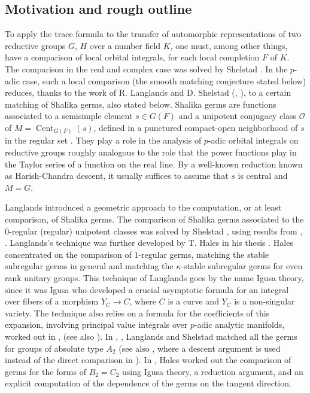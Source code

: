 \documentclass[12pt,letterpaper]{amsart}
\theoremstyle{plain}
\theoremstyle{definition}
\theoremstyle{remark}
\theoremstyle{definition}
\DeclareMathOperator{\Cent}{Cent}
\begin{document}
\subsection*{Motivation and rough outline}

To apply the trace formula to the transfer of automorphic representations
of two reductive groups $G$, $H$ over a number field $K$, one must,
among other things, have a comparison of local orbital integrals, for each
local completion $F$ of $K$. The comparison in the real and complex case
was solved by Shelstad \cite{She82}.
In the $p$-adic case, such a local comparison (the smooth matching conjecture
stated below) reduces, thanks to the work of R. Langlands and D. Shelstad
(\cite{LS87}, \cite{LS90}), to a certain matching of Shalika germs,
also stated below.
Shalika germs are functions
associated to a semisimple element $s\in G(F)$ and a unipotent
conjugacy class ${\mathcal O}$ of $M=\Cent_{G(F)}(s)$, defined in a punctured
compact-open neighborhood of $s$ in the regular set \cite{Sh72}. They play a
role in the analysis of $p$-adic orbital integrals on reductive groups
roughly analogous to the role that the power functions play in the Taylor
series of a function on the real line. By a well-known reduction known
as Harish-Chandra descent, it usually suffices to assume that $s$ is central
and $M=G$.

Langlands \cite{La83} introduced a geometric approach to the computation,
or at least comparison, of Shalika germs.
The comparison of Shalika germs associated to the
$0$-regular (regular) unipotent classes was solved by Shelstad \cite{She89},
using results from \cite{LS87}, \cite{LS90}.
Langlands's technique was further developed by
T. Hales in his thesis \cite{Ha92a}. Hales concentrated on the comparison of
$1$-regular germs, matching the stable subregular germs in general and
matching the $\kappa$-stable subregular germs for even rank unitary
groups. This technique of Langlands goes by
the name Igusa theory, since it was Igusa \cite{Ig78} who developed a crucial
asymptotic formula for an integral over fibers of a morphism
$Y_C\rightarrow C$, where $C$ is a curve and $Y_C$ is a non-singular
variety. The technique also relies on a formula for the coefficients
of this expansion, involving principal value integrals over $p$-adic
analytic manifolds, worked out in \cite{Ig78}, \cite{La83} (see also
\cite{LS83}). In \cite{La83}, \cite{LS89}, Langlands and Shelstad
matched all the germs for groups of absolute type $A_2$
(see also \cite{Ha92b}, where a descent argument is used instead of
the direct comparison in \cite{LS89}).
In \cite{Ha89}, Hales worked out the comparison of germs for the forms of
$B_2=C_2$ using Igusa theory, a reduction argument, and an explicit
computation of the dependence of the germs on the tangent direction.
\end{document}
